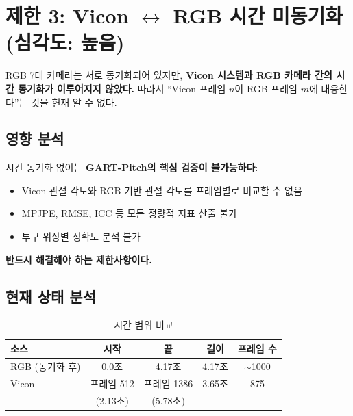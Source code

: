 \documentclass[11pt, a4paper]{report}
\begin{document}
\section{제한 3: Vicon $\leftrightarrow$ RGB 시간 미동기화 (심각도: 높음)}
\label{sec:constraint3}

\begin{constraintbox}[title={제한 3: 시간 동기화 미비 --- \textbf{가장 심각}}]
RGB 7대 카메라는 서로 동기화되어 있지만,
\textbf{Vicon 시스템과 RGB 카메라 간의 시간 동기화가 이루어지지 않았다.}
따라서 ``Vicon 프레임 $n$이 RGB 프레임 $m$에 대응한다''는 것을 현재 알 수 없다.
\end{constraintbox}

\subsection{영향 분석}

\begin{warningbox}
시간 동기화 없이는 \textbf{GART-Pitch의 핵심 검증이 불가능하다}:
\begin{itemize}[nosep]
  \item Vicon 관절 각도와 RGB 기반 관절 각도를 프레임별로 비교할 수 없음
  \item MPJPE, RMSE, ICC 등 모든 정량적 지표 산출 불가
  \item 투구 위상별 정확도 분석 불가
\end{itemize}
\textbf{반드시 해결해야 하는 제한사항이다.}
\end{warningbox}

\subsection{현재 상태 분석}

\begin{table}[H]
\centering
\caption{시간 범위 비교}
\label{tab:time_ranges}
\renewcommand{\arraystretch}{1.3}
\begin{tabular}{lcccc}
\toprule
\textbf{소스} & \textbf{시작} & \textbf{끝} & \textbf{길이} & \textbf{프레임 수} \\
\midrule
RGB (동기화 후) & 0.0초 & 4.17초 & 4.17초 & $\sim$1000 \\
Vicon & 프레임 512 & 프레임 1386 & 3.65초 & 875 \\
& (2.13초) & (5.78초) & & \\
\bottomrule
\end{tabular}
\end{table}
\end{document}
